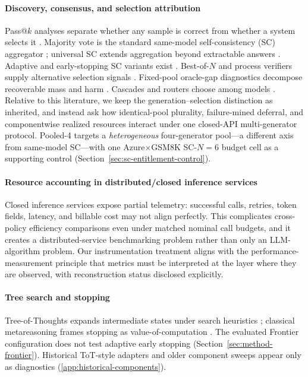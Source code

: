 \paragraph{Discovery, consensus, and selection attribution}
Pass@$k$ analyses separate whether any sample is correct from whether a system selects it
\citep{passatk,ll_monkeys}. Majority vote is the standard same-model self-consistency (SC)
aggregator \citep{selfconsistency}; universal SC extends aggregation beyond extractable answers
\citep{universal_sc}. Adaptive and early-stopping SC variants exist
\citep{adaptive_consistency,esc,difficulty_adaptive_sc,reasc}. Best-of-$N$ and process verifiers
supply alternative selection signals \citep{self_certainty,letsverify}. Fixed-pool oracle-gap
diagnostics decompose recoverable mass and harm \citep{oracle_gap}. Cascades and routers choose
among models \citep{frugalgpt,hybrid_llm,routellm}. Relative to this literature, we keep the
generation--selection distinction as inherited, and instead ask how identical-pool plurality,
failure-mined deferral, and componentwise realized resources interact under one closed-API
multi-generator protocol. Pooled-4 targets a \emph{heterogeneous} four-generator pool---a different
axis from same-model SC---with one Azure$\times$GSM8K SC-$N{=}6$ budget cell as a supporting
control (Section~\ref{sec:sc-entitlement-control}).

\paragraph{Resource accounting in distributed/closed inference services}
Closed inference services expose partial telemetry: successful calls, retries, token fields,
latency, and billable cost may not align perfectly. This complicates cross-policy efficiency
comparisons even under matched nominal call budgets, and it creates a distributed-service
benchmarking problem rather than only an LLM-algorithm problem. Our instrumentation treatment aligns
with the performance-measurement principle that metrics must be interpreted at the layer where they
are observed, with reconstruction status disclosed explicitly.

\paragraph{Tree search and stopping}
Tree-of-Thoughts expands intermediate states under search heuristics \citep{tot}; classical
metareasoning frames stopping as value-of-computation \citep{metareasoning}. The evaluated Frontier
configuration does not test adaptive early stopping (Section~\ref{sec:method-frontier}). Historical
ToT-style adapters and older component sweeps appear only as diagnostics
(\ref{app:historical-components}).
